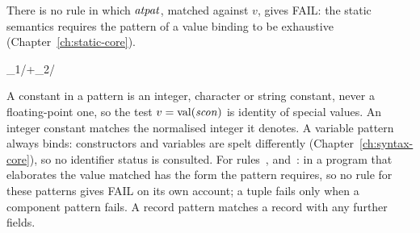 \begin{rulecomments}
 There is no rule in which $\mathit{atpat}$, matched
against $v$, gives FAIL: the static semantics requires the pattern of a value
binding to be exhaustive (Chapter~\ref{ch:static-core}).
\end{rulecomments}



  {}

  {}


  {}

  {}


  {
        {\VE_1/\FAIL+\VE_2/\FAIL{}}}



  {}

  {}

\begin{rulecomments}
 A constant in a pattern is an
integer, character or string constant, never a floating-point one, so the
test $v=\mathrm{val}(\mathit{scon})$ is identity of special values. An integer constant
matches the normalised integer it denotes. %
 A variable pattern always binds: constructors and
variables are spelt differently (Chapter~\ref{ch:syntax-core}), so no
identifier status is consulted.
 For rules~,
 and~: in a program that elaborates the value matched has the
form the pattern requires, so no rule for these patterns gives FAIL on its
own account; a tuple fails only when a component pattern fails. A record
pattern matches a record with any further fields.
\end{rulecomments}


